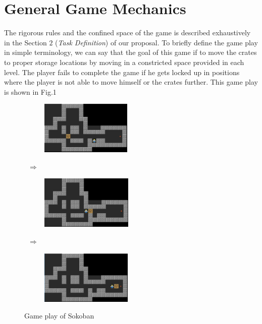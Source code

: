 \documentclass[10pt, final]{article}
\newcommand{\br}[1][.75]{\ \\[#1\baselineskip]}
\begin{document}
\section{General Game Mechanics}
The rigorous rules and the confined space of the game is described exhaustively in the Section $2$ (\textit{Task Definition}) of our proposal. To briefly define the game play in simple terminology, we can say that the goal of this game if to move the crates to proper storage locations by moving in a constricted space provided in each level. The player fails to complete the game if he gets locked up in positions where the player is not able to move himself or the crates further. This game play is shown in Fig.1 \br
\begin{figure}[h!]
	\centering
	{
		\begin{subfigure}[h!]{1.7in}
			\includegraphics[height=1in]{pic1.png}
		\end{subfigure}
		~$\mathbf{\Longrightarrow}$~
		\begin{subfigure}[h!]{1.7in}
			\includegraphics[height=1in]{pic2.png}
		\end{subfigure}
		~$\mathbf{\Longrightarrow}$~
		\begin{subfigure}[h!]{1.7in}
			\includegraphics[height=1in]{pic3.png}
	\end{subfigure}}
	\caption{Game play of Sokoban}
	\label{fig:chain}
\end{figure}
\end{document}
